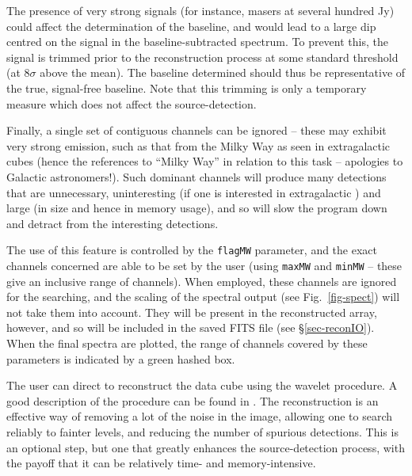 The presence of very strong signals (for instance, masers at several
hundred Jy) could affect the determination of the baseline, and would
lead to a large dip centred on the signal in the baseline-subtracted
spectrum. To prevent this, the signal is trimmed prior to the
reconstruction process at some standard threshold (at $8\sigma$ above
the mean). The baseline determined should thus be representative of
the true, signal-free baseline. Note that this trimming is only a
temporary measure which does not affect the source-detection.


Finally, a single set of contiguous channels can be ignored -- these
may exhibit very strong emission, such as that from the Milky Way as
seen in extragalactic \hi cubes (hence the references to ``Milky
Way'' in relation to this task -- apologies to Galactic
astronomers!). Such dominant channels will produce many detections
that are unnecessary, uninteresting (if one is interested in
extragalactic \hi) and large (in size and hence in memory usage), and
so will slow the program down and detract from the interesting
detections. 

The use of this feature is controlled by the \texttt{flagMW}
parameter, and the exact channels concerned are able to be set by the
user (using \texttt{maxMW} and \texttt{minMW} -- these give an
inclusive range of channels). When employed, these channels are
ignored for the searching, and the scaling of the spectral output (see
Fig.~\ref{fig-spect}) will not take them into account. They will be
present in the reconstructed array, however, and so will be included
in the saved FITS file (see \S\ref{sec-reconIO}). When the final
spectra are plotted, the range of channels covered by these parameters
is indicated by a green hashed box.

\label{sec-recon}

The user can direct \duchamp to reconstruct the data cube using the
\atrous wavelet procedure. A good description of the procedure can be
found in \citet{starck02:book}. The reconstruction is an effective way
of removing a lot of the noise in the image, allowing one to search
reliably to fainter levels, and reducing the number of spurious
detections. This is an optional step, but one that greatly enhances
the source-detection process, with the payoff that it can be
relatively time- and memory-intensive.


